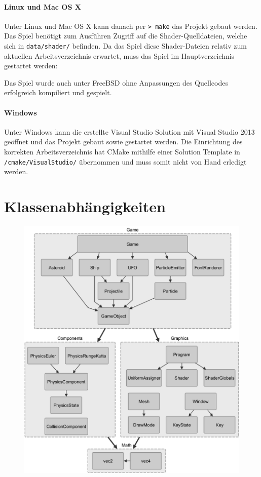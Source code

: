 \documentclass[12pt, a4paper, titlepage, hidelinks]{scrreprt}
\begin{document}
\paragraph{Linux und Mac OS X}
Unter Linux und Mac OS X kann danach per \texttt{>~make} das Projekt gebaut werden. Das Spiel benötigt zum Ausführen Zugriff auf die Shader-Quelldateien, welche sich in \texttt{data/shader/} befinden. Da das Spiel diese Shader-Dateien relativ zum aktuellen Arbeitsverzeichnis erwartet, muss das Spiel im Hauptverzeichnis gestartet werden:

Das Spiel wurde auch unter FreeBSD ohne Anpassungen des Quellcodes erfolgreich kompiliert und gespielt.

\paragraph{Windows}
Unter Windows kann die erstellte Visual Studio Solution mit Visual Studio 2013 geöffnet und das Projekt gebaut sowie gestartet werden. Die Einrichtung des korrekten Arbeitsverzeichnis hat CMake mithilfe einer Solution Template in \texttt{/cmake/VisualStudio/} übernommen und muss somit nicht von Hand erledigt werden.

\section{Klassenabhängigkeiten}
\begin{figure}[h!]
  \centering
  \includegraphics[width=\textwidth]{../graphs/dependency1.png}
\end{figure}
\end{document}
